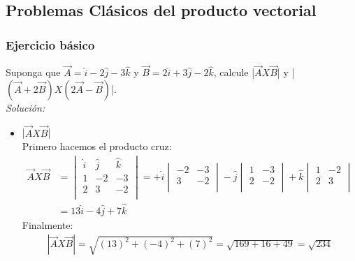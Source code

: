 \documentclass[12pt,openany]{book}
\begin{document}
		\subsection{Problemas Cl\'asicos del producto vectorial}

			\subsubsection{Ejercicio b\'asico}
				\noindent Suponga que $\vec{A}= \hat{i}-2\hat{j}-3\hat{k}$ y $\vec{B}=2\hat{i}+3\hat{j}-2\hat{k}$, 
				calcule |$\vec{A}X\vec{B}$| y |$(\vec{A}+2\vec{B})X(2\vec{A}-\vec{B})$|.\\
				\noindent\textsl{Soluci\'on:}\\
					\begin{itemize}
						\item |$\vec{A}X\vec{B}$|\\
							Primero hacemos el producto cruz:
								\begin{equation*}
									\begin{split}
										\vec{A}X\vec{B}&=\begin{vmatrix}
					 									\hat{i} & \hat{j} & \hat{k} \\
					 									   1    &   -2    &    -3   \\
					 									   2    &    3    &     -2   \\    
					 									\end{vmatrix}
					 									=+\hat{i} \begin{vmatrix}
					 	    										-2 & -3 \\
					 	    										 3 & -2 \\
					 	    									\end{vmatrix}
					 	    							-\hat{j}\begin{vmatrix}
					 	    										1 & -3 \\
					 	    										2 &  -2 \\
					 	    									\end{vmatrix}
					 	    						   +\hat{k}\begin{vmatrix}
					 	    										1 & -2 \\
					 	    										2 &  3 \\
					 	    									\end{vmatrix}\\
					 	    					   &=13\hat{i}-4\hat{j}+7\hat{k}
									\end{split}
								\end{equation*}
								 Finalmente:
								\begin{equation*}
								 	\begin{split}
								 		|\vec{A}X\vec{B}|=\sqrt{(13)^{2}+(-4)^{2}+(7)^{2}}=\sqrt{169+16+49}=\sqrt{234}
								 	\end{split}
								 \end{equation*}
						 	

\end{itemize}
\end{document}
